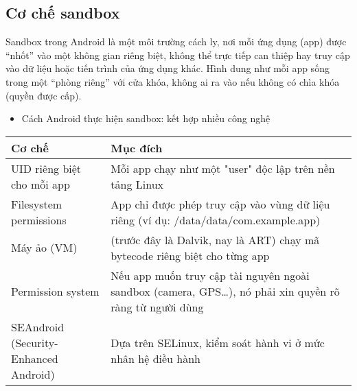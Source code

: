 \subsection{Cơ chế sandbox}
\renewcommand{\labelitemi}{--}    
    \begin{flushleft}
        \hspace*{0.8cm}Sandbox trong Android là một môi trường cách ly, nơi mỗi ứng dụng (app) được “nhốt” vào một không gian riêng biệt, không thể trực tiếp can thiệp hay truy cập vào dữ liệu hoặc tiến trình của ứng dụng khác. Hình dung như mỗi app sống trong một “phòng riêng” với cửa khóa, không ai ra vào nếu không có chìa khóa (quyền được cấp).
        \setlength{\leftmargini}{1.5cm}
        \begin{itemize}
            \item Cách Android thực hiện sandbox: kết hợp nhiều công nghệ
        \end{itemize}
        \begin{center}
            \renewcommand{\arraystretch}{1.5}
            \begin{tabular}{|p{4.5cm}|p{11cm}|}
            \hline
            \textbf{Cơ chế} & \textbf{Mục đích} \\
            \hline
            UID riêng biệt cho mỗi app	 & Mỗi app chạy như một "user" độc lập trên nền tảng Linux            \\
            \hline
            Filesystem permissions	 & App chỉ được phép truy cập vào vùng dữ liệu riêng (ví dụ: /data/data/com.example.app) \\
            \hline
            Máy ảo (VM)	 & (trước đây là Dalvik, nay là ART) chạy mã bytecode riêng biệt cho từng app            \\
            \hline
            Permission system	 & 	Nếu app muốn truy cập tài nguyên ngoài sandbox (camera, GPS…), nó phải xin quyền rõ ràng từ người dùng            \\
            \hline
            SEAndroid (Security-Enhanced Android)	 & 	Dựa trên SELinux, kiểm soát hành vi ở mức nhân hệ điều hành            \\
            \hline
            \end{tabular}
            \end{center}
    \end{flushleft}

